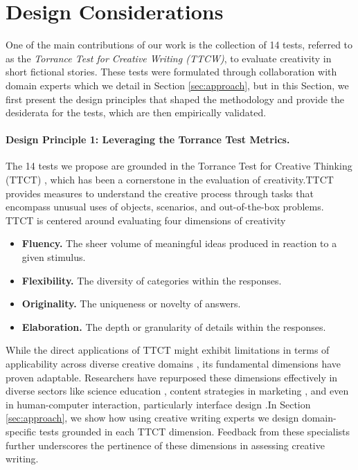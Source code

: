 \section{Design Considerations}\label{design}

One of the main contributions of our work is the collection of 14 tests, referred to as the \textit{Torrance Test for Creative Writing (TTCW)}, to evaluate creativity in short fictional stories. These tests were formulated through collaboration with domain experts which we detail in Section \ref{sec:approach}, but in this Section, we first present the design principles that shaped the methodology and provide the desiderata for the tests, which are then empirically validated.

\paragraph{Design Principle 1: Leveraging the Torrance Test Metrics.} The 14 tests we propose are grounded in the Torrance Test for Creative Thinking (TTCT) \cite{torrance1966torrance}, which has been a cornerstone in the evaluation of creativity.TTCT provides measures to understand the creative process through tasks that encompass unusual uses of objects, scenarios, and out-of-the-box problems. TTCT is centered around evaluating four dimensions of creativity

\begin{itemize}
\item \textbf{Fluency.} The sheer volume of meaningful ideas produced in reaction to a given stimulus.
\item \textbf{Flexibility.} The diversity of categories within the responses. 
\item \textbf{Originality.} The uniqueness or novelty of answers.
\item \textbf{Elaboration.} The depth or granularity of details within the responses.
\end{itemize}

While the direct applications of TTCT might exhibit limitations in terms of applicability across diverse creative domains \cite{amabile1982social,baer2009assessing}, its fundamental dimensions have proven adaptable. Researchers have repurposed these dimensions effectively in diverse sectors like science education \cite{trisnayanti2019development}, content strategies in marketing \cite{mcintyre2003individual}, and even in human-computer interaction, particularly interface design \cite{10.1145/3313831.3376495}.In Section \ref{sec:approach}, we show how using creative writing experts we design domain-specific tests grounded in each TTCT dimension. Feedback from these specialists further underscores the pertinence of these dimensions in assessing creative writing.

